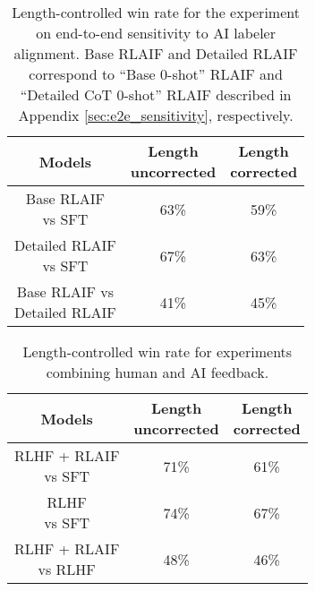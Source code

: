\documentclass[11pt]{article}
\begin{document}
\begin{table}[ht]
\centering

\begin{tabular}{|c|c|c|}
\hline
Models         & \makecell{Length \\ uncorrected} & \makecell{Length \\ corrected} \\\hline
\makecell{Base RLAIF \\ vs SFT} & 63\%               & 59\%             \\\hline
\makecell{Detailed RLAIF \\ vs SFT}  & 67\%               & 63\%             \\\hline
\makecell{Base RLAIF vs \\ Detailed RLAIF}  & 41\%               & 45\%             \\\hline
\end{tabular}

\caption{Length-controlled win rate for the experiment on end-to-end sensitivity to AI labeler alignment. Base RLAIF and Detailed RLAIF correspond to ``Base 0-shot'' RLAIF and ``Detailed CoT 0-shot'' RLAIF described in Appendix \ref{sec:e2e_sensitivity}, respectively.}
\label{tab:e2e}
\end{table}

\begin{table}[ht]
\centering

\begin{tabular}{|c|c|c|}
\hline
Models         & \makecell{Length \\ uncorrected} & \makecell{Length \\ corrected} \\\hline
\makecell{RLHF + RLAIF \\ vs SFT}  & 71\%               & 61\%             \\\hline
\makecell{RLHF \\ vs SFT} & 74\%               & 67\%             \\\hline
\makecell{RLHF + RLAIF \\ vs RLHF}  & 48\%               & 46\%             \\\hline
\end{tabular}

\caption{Length-controlled win rate for experiments combining human and AI feedback.}
\label{tab:length_rlhf_rlaif_combined}
\end{table}
\end{document}
